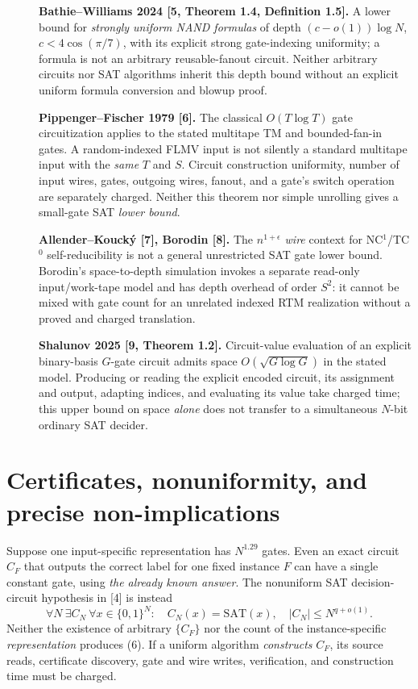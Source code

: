 \documentclass[11pt]{article}
\begin{document}
\begin{description}
\item[] \textbf{Bathie--Williams 2024 [5, Theorem 1.4,
Definition 1.5].}
A lower bound for \emph{strongly uniform NAND formulas}
of depth $(c-o(1))\log N$, $c<4\cos(\pi/7)$,
with its explicit strong gate-indexing uniformity;
a formula is not an arbitrary reusable-fanout circuit.
Neither arbitrary circuits nor SAT algorithms inherit this depth
bound without an explicit uniform formula conversion and blowup proof.

\item[] \textbf{Pippenger--Fischer 1979 [6].}
The classical $O(T\log T)$ gate circuitization applies
to the stated multitape TM and bounded-fan-in gates.
A random-indexed FLMV input is not silently a standard
multitape input with the \emph{same} $T$ and $S$.
Circuit construction uniformity, number of input wires,
gates, outgoing wires, fanout, and a gate's switch
operation are separately charged. Neither this theorem nor
simple unrolling gives a small-gate SAT \emph{lower bound}.

\item[] \textbf{Allender--Kouck\'y [7], Borodin [8].}
The $n^{1+\epsilon}$ \emph{wire} context for
NC$^1$/TC$^0$ self-reducibility is not a general
unrestricted SAT gate lower bound. Borodin's
space-to-depth simulation invokes a separate read-only
input/work-tape model and has depth overhead of order $S^2$:
it cannot be mixed with gate count for an unrelated indexed
RTM realization without a proved and charged translation.

\item[] \textbf{Shalunov 2025 [9, Theorem 1.2].}
Circuit-value evaluation of an explicit binary-basis
$G$-gate circuit admits space
$O(\sqrt{G\log G})$ in the stated model.
Producing or reading the explicit encoded circuit, its
assignment and output, adapting indices, and evaluating
its value take charged time; this upper bound on
space \emph{alone} does not transfer to a simultaneous
$N$-bit ordinary SAT decider.
\end{description}

\section{Certificates, nonuniformity, and precise non-implications}
Suppose one input-specific representation has $N^{1.29}$ gates.
Even an exact circuit $C_F$ that outputs the correct label
for one fixed instance $F$ can have a single constant gate,
using \emph{the already known answer}. The nonuniform
SAT decision-circuit hypothesis in [4] is instead
\[
 \forall N\ \exists C_N\ \forall x\in\{0,1\}^N:
 \quad C_N(x)=\mathrm{SAT}(x),\quad |C_N|\le N^{q+o(1)}.
 \tag{6}
\]
Neither the existence of arbitrary $\{C_F\}$ nor the
count of the instance-specific \emph{representation} produces
(6). If a uniform algorithm \emph{constructs} $C_F$,
its source reads, certificate discovery, gate and wire
writes, verification, and construction time must be charged.
\end{document}
